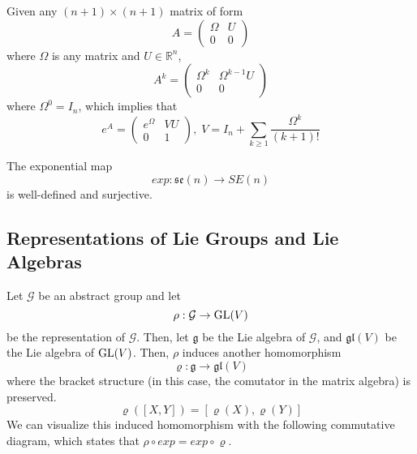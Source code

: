   \begin{lemma}
    Given any $(n+1) \times (n+1)$ matrix of form 
    \begin{equation}
      A = \begin{pmatrix}
       \Omega & U \\0&0
      \end{pmatrix}
    \end{equation}
    where $\Omega$ is any matrix and $U \in \mathbb{R}^n$, 
    \begin{equation}
      A^k = \begin{pmatrix}
      \Omega^k & \Omega^{k-1} U \\0&0
      \end{pmatrix}
    \end{equation}
    where $\Omega^0 = I_n$, which implies that
    \begin{equation}
      e^A = \begin{pmatrix}
      e^\Omega & V U \\ 0 & 1
      \end{pmatrix}, \; V = I_n + \sum_{k \geq 1} \frac{\Omega^k}{(k+1)!}
    \end{equation}
  \end{lemma}

  \begin{theorem}
    The exponential map
    \begin{equation}
      exp: \mathfrak{se}(n) \rightarrow SE(n)
    \end{equation}
    is well-defined and surjective. 
  \end{theorem}

\subsection{Representations of Lie Groups and Lie Algebras}

  Let $\mathcal{G}$ be an abstract group and let
  \begin{equation}
    \rho: \mathcal{G} \rightarrow \GL(V)
  \end{equation}
  be the representation of $\mathcal{G}$. Then, let $\mathfrak{g}$ be the Lie algebra of $\mathcal{G}$, and $\mathfrak{gl}(V)$ be the Lie algebra of $\GL(V)$. Then, $\rho$ induces another homomorphism 
  \begin{equation}
    \varrho: \mathfrak{g} \rightarrow \mathfrak{gl}(V)
  \end{equation}
  where the bracket structure (in this case, the comutator in the matrix algebra) is preserved. 
  \begin{equation}
    \varrho([X,Y]) = [\varrho(X), \varrho(Y)]
  \end{equation}
  We can visualize this induced homomorphism with the following commutative diagram, which states that $\rho \circ exp = exp \circ \varrho$. 

